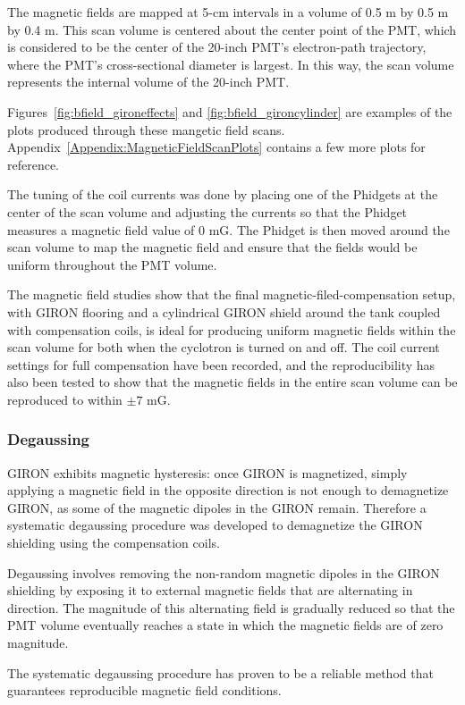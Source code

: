The magnetic fields are mapped at 5-cm intervals in a volume of 0.5 m by 0.5 m by 0.4 m. This scan volume is centered about the center point of the PMT, which is considered to be the center of the 20-inch PMT's electron-path trajectory, where the PMT's cross-sectional diameter is largest. In this way, the scan volume represents the internal volume of the 20-inch PMT.

Figures~\ref{fig:bfield_gironeffects} and \ref{fig:bfield_gironcylinder} are examples of the plots produced through these mangetic field scans. Appendix~\ref{Appendix:MagneticFieldScanPlots} contains a few more plots for reference.

The tuning of the coil currents was done by placing one of the Phidgets at the center of the scan volume and adjusting the currents so that the Phidget measures a magnetic field value of 0 mG. The Phidget is then moved around the scan volume to map the magnetic field and ensure that the fields would be uniform throughout the PMT volume.

The magnetic field studies show that the final magnetic-filed-compensation setup, with GIRON flooring and a cylindrical GIRON shield around the tank coupled with compensation coils, is ideal for producing uniform magnetic fields within the scan volume for both when the cyclotron is turned on and off. The coil current settings for full compensation have been recorded, and  the reproducibility has also been tested to show that the magnetic fields in the entire scan volume can be reproduced to within $\pm7$ mG.


\subsubsection{Degaussing}

GIRON exhibits magnetic hysteresis: once GIRON is magnetized, simply applying a magnetic field in the opposite direction is not enough to demagnetize GIRON, as some of the magnetic dipoles in the GIRON remain. Therefore a systematic degaussing procedure was developed to demagnetize the GIRON shielding using the compensation coils.

Degaussing involves removing the non-random magnetic dipoles in the GIRON shielding by exposing it to external magnetic fields that are alternating in direction. The magnitude of this alternating field is gradually reduced so that the PMT volume eventually reaches a state in which the magnetic fields are of zero magnitude.

The systematic degaussing procedure has proven to be a reliable method that guarantees reproducible magnetic field conditions. 

